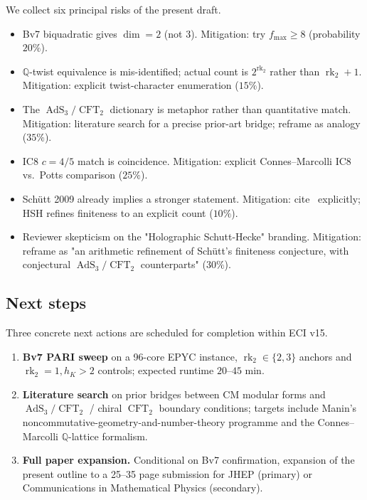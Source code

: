 \documentclass[11pt,a4paper]{amsart}
\theoremstyle{definition}
\DeclareMathOperator{\rk}{rk}
\DeclareMathOperator{\AdS}{AdS}
\DeclareMathOperator{\CFT}{CFT}
\newcommand{\Q}{\mathbb{Q}}
\newcommand{\rktwo}{\rk_{2}}
\begin{document}
We collect six principal risks of the present draft.

\begin{itemize}
\item[R1.] Bv7 biquadratic gives $\dim = 2$ (not 3). Mitigation: try $f_{\max} \ge 8$
(probability $20\%$).
\item[R2.] $\Q$-twist equivalence is mis-identified; actual count is $2^{\rktwo}$ rather
than $\rktwo + 1$. Mitigation: explicit twist-character enumeration ($15\%$).
\item[R3.] The $\AdS_3/\CFT_2$ dictionary is metaphor rather than quantitative match.
Mitigation: literature search for a precise prior-art bridge; reframe as analogy
($35\%$).
\item[R4.] IC8 $c = 4/5$ match is coincidence. Mitigation: explicit Connes--Marcolli
IC8 vs.\ Potts comparison ($25\%$).
\item[R5.] Sch\"utt 2009 already implies a stronger statement. Mitigation: cite~\cite{Schutt2009}
explicitly; HSH refines finiteness to an explicit count ($10\%$).
\item[R6.] Reviewer skepticism on the "Holographic Schutt-Hecke" branding. Mitigation:
reframe as "an arithmetic refinement of Sch\"utt's finiteness conjecture, with
conjectural $\AdS_3/\CFT_2$ counterparts" ($30\%$).
\end{itemize}

\subsection{Next steps}\label{ss:next-steps}

Three concrete next actions are scheduled for completion within ECI v15.

\begin{enumerate}[label=(\arabic*),leftmargin=*]
\item \textbf{Bv7 PARI sweep} on a 96-core EPYC instance, $\rktwo \in \{2,3\}$ anchors
and $\rktwo = 1, h_K > 2$ controls; expected runtime $20$--$45$ min.
\item \textbf{Literature search} on prior bridges between CM modular forms and
$\AdS_3/\CFT_2$ / chiral $\CFT_2$ boundary conditions; targets include Manin's
noncommutative-geometry-and-number-theory programme and the Connes--Marcolli $\Q$-lattice
formalism.
\item \textbf{Full paper expansion.} Conditional on Bv7 confirmation, expansion of the
present outline to a 25--35 page submission for JHEP (primary) or Communications in
Mathematical Physics (secondary).
\end{enumerate}
\end{document}
